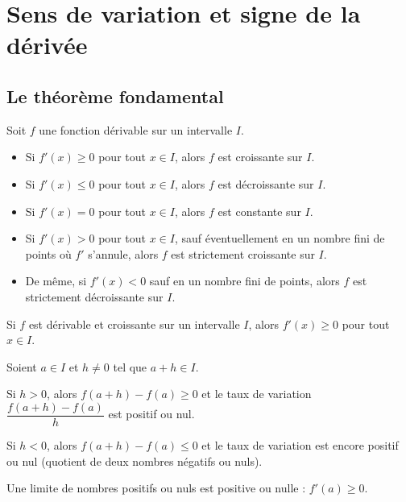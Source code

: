 \section{Sens de variation et signe de la dérivée}

\subsection{Le théorème fondamental}

\begin{theoreme}
	Soit $f$ une fonction dérivable sur un intervalle $I$.
	\begin{itemize}
		\item Si $f'(x) \geq 0$ pour tout $x \in I$, alors $f$ est croissante sur $I$.
		\item Si $f'(x) \leq 0$ pour tout $x \in I$, alors $f$ est décroissante sur $I$.
		\item Si $f'(x) = 0$ pour tout $x \in I$, alors $f$ est constante sur $I$.
		\item Si $f'(x) > 0$ pour tout $x \in I$, sauf éventuellement en un nombre fini de points où $f'$ s'annule, alors $f$ est strictement croissante sur $I$.
		\item De même, si $f'(x) < 0$ sauf en un nombre fini de points, alors $f$ est strictement décroissante sur $I$.
	\end{itemize}
\end{theoreme}

\begin{propriete}[Réciproque]
	Si $f$ est dérivable et croissante sur un intervalle $I$, alors $f'(x) \geq 0$ pour tout $x \in I$.
\end{propriete}

\begin{demonstration}
	Soient $a \in I$ et $h \neq 0$ tel que $a + h \in I$.

	Si $h > 0$, alors $f(a + h) - f(a) \geq 0$ et le taux de variation $\dfrac{f(a + h) - f(a)}{h}$ est positif ou nul.

	Si $h < 0$, alors $f(a + h) - f(a) \leq 0$ et le taux de variation est encore positif ou nul (quotient de deux nombres négatifs ou nuls).

	Une limite de nombres positifs ou nuls est positive ou nulle : $f'(a) \geq 0$.
\end{demonstration}

